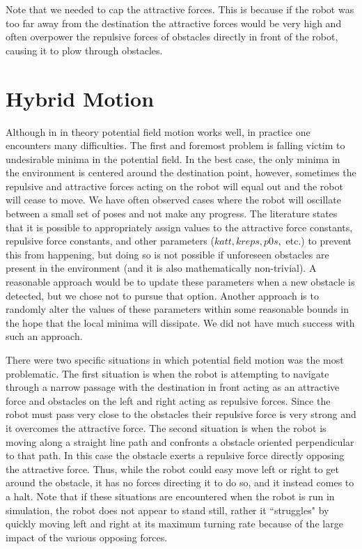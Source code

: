 \documentclass[12pt]{article}
\begin{document}
Note that we needed to cap the attractive forces. This is because if the robot was too far away from the destination the attractive forces would be very high and often overpower the repulsive forces of obstacles directly in front of the robot, causing it to plow through obstacles.


\section{Hybrid Motion}
\label{sec:robotmotion}

Although in in theory potential field motion works well, in practice one encounters many difficulties. The first and foremost problem is falling victim to undesirable minima in the potential field. In the best case, the only minima in the environment is centered around the destination point, however, sometimes the repulsive and attractive forces acting on the robot will equal out and the robot will cease to move. We have often observed cases where the robot will oscillate between a small set of poses and not make any progress. The literature states that it is possible to appropriately assign values to the attractive force constants, repulsive force constants, and other parameters ($katt, kreps, p0s,$ etc.) to prevent this from happening, but doing so is not possible if unforeseen obstacles are present in the environment (and it is also mathematically non-trivial). A reasonable approach would be to update these parameters when a new obstacle is detected, but we chose not to pursue that option. Another approach is to randomly alter the values of these parameters within some reasonable bounds in the hope that the local minima will dissipate. We did not have much success with such an approach.

There were two specific situations in which potential field motion was the most problematic. The first situation is when the robot is attempting to navigate through a narrow passage with the destination in front acting as an attractive force and obstacles on the left and right acting as repulsive forces. Since the robot must pass very close to the obstacles their repulsive force is very strong and it overcomes the attractive force. The second situation is when the robot is moving along a straight line path and confronts a obstacle oriented perpendicular to that path. In this case the obstacle exerts a repulsive force directly opposing the attractive force. Thus, while the robot could easy move left or right to get around the obstacle, it has no forces directing it to do so, and it instead comes to a halt. Note that if these situations are encountered when the robot is run in simulation, the robot does not appear to stand still, rather it ``struggles" by quickly moving left and right at its maximum turning rate because of the large impact of the various opposing forces.
\end{document}
